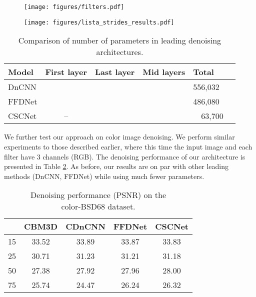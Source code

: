 \documentclass{article}
\begin{document}
\begin{figure}[t]
\centering
\begin{minipage}{.5\textwidth}
  \centering
  \texttt{[image: figures/filters.pdf]}
  \label{fig:filters}
\end{minipage}\begin{minipage}{.5\textwidth}
  \centering
  \texttt{[image: figures/lista\_strides\_results.pdf]}
  \label{fig:stride}
\end{minipage}
\vspace{-3mm}
\end{figure}

\begin{table}[h]
\vspace{-2mm}
\centering
\caption{Comparison of number of parameters in leading denoising architectures.\label{table:params}}
\begin{tabular}{@{}llllll@{}}
\toprule
       Model & First layer                  & Last layer                   & Mid layers                                                                     & Total   \\ \midrule
DnCNN  &  &  &                                            & 556,032 \\
FFDNet &  &  &                                            & 486,080 \\
CSCNet & \multicolumn{1}{c}{--}                           &       &  & \multicolumn{1}{r}{~~63,700}  \\ \bottomrule
\end{tabular}
\end{table}

We further test our approach on color image denoising. We perform similar experiments to those described earlier, where this time the input image and each filter have 3 channels (RGB). The denoising performance of our architecture is presented in Table \ref{table:color}. As before, our results are on par with other leading methods (DnCNN, FFDNet) while using much fewer parameters.


\begin{table}[t]
\centering
\caption{Denoising performance (PSNR) on the \\ color-BSD68 dataset.\label{table:color}}
\begin{tabular}{@{}ccccc@{}}
\toprule
 & CBM3D & CDnCNN & FFDNet & CSCNet \\ \midrule
15       & 33.52 & 33.89  & 33.87  & 33.83  \\
25       & 30.71 & 31.23  & 31.21  & 31.18  \\
50       & 27.38 & 27.92  & 27.96  & 28.00  \\
75       & 25.74 & 24.47  & 26.24  & 26.32  \\ \bottomrule
\end{tabular}
\end{table}
\end{document}
